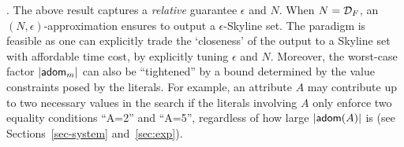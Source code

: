 . 
The above result captures a {\em relative}
guarantee \wrt $\epsilon$ 
and $N$. When %
$N = {\mathcal D}_F$, an $(N,\epsilon)$-approximation ensures to output a $\epsilon$-Skyline set. 
The paradigm is feasible as one can explicitly trade the `closeness' of the output 
to a Skyline set with affordable time cost, by explicitly tuning 
$\epsilon$ and $N$. %
Moreover, 
the worst-case factor $|{\mathsf{adom}}_m|$ 
can also be ``tightened'' by 
a bound 
determined by
the value constraints posed by 
the literals. For example, an attribute 
$A$ %
may contribute up to two necessary values 
in the search if 
the literals involving $A$ only enforce 
two equality conditions ``A=2'' and ``A=5'', 
regardless of how large $|{\mathsf{adom}}(A)|$ is 
(see 
Sections~\ref{sec-system} and~\ref{sec:exp}).





